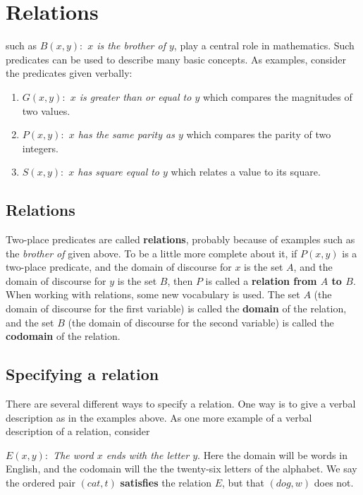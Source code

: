 \chapter{Relations}\label{ch:Relations}


 such as {\itshape $B(x,y) :$ $x$ is the brother of $y$}, play a 
central role in mathematics. Such predicates can be used to describe many basic concepts. 
As examples, consider the predicates given verbally:
\begin{enumerate}
 \item {\itshape $G(x,y) :$ $x$ is greater than or equal to $y$}
 which compares the  magnitudes of two values.
 
 \item {\itshape $P(x,y) :$ $x$ has the same parity as $y$} which
 compares the parity of two integers.
 
 \item {\itshape $S(x,y) :$ $x$ has square equal to $y$} which relates
 a value to its square.
\end{enumerate}

\section{Relations}
Two-place predicates are called {\bfseries relations}, probably because of examples
such as the {\itshape brother of} given above. To be a little more complete about it,
if $P(x,y)$ is a two-place predicate, and the domain of discourse for $x$ is the set $A$,
and the domain of discourse for $y$ is the set $B$, then $P$ is called a {\bfseries relation
from $A$ to $B$}.  When working with relations, some new vocabulary is used.
The set $A$ (the domain of discourse for the first variable) is called the {\bfseries domain}
of the relation, and the set $B$ (the domain of discourse for the second variable) is
called the {\bfseries codomain} of the relation.

\section{Specifying a relation}
There are several different ways to specify a relation. One way is to give a verbal
description as in the examples above. As one more example of a verbal description
of a relation, consider 

{\itshape $E(x,y) :$ The word $x$ ends with the letter $y$}. Here the domain
will be words in English, and the codomain will the the twenty-six letters of the alphabet.
We say the ordered pair $(cat,t)$ {\bfseries satisfies} the relation $E$, but that
$(dog,w)$ does not.

